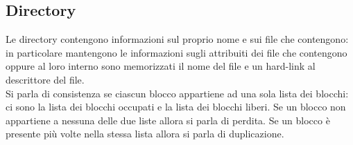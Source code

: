 \documentclass{article}
\begin{document}
\subsection{Directory}
Le directory contengono informazioni sul proprio nome e sui file che contengono: in particolare mantengono le informazioni sugli attribuiti dei file che contengono oppure al loro interno sono memorizzati il nome del file e un hard-link al descrittore del file.\\

Si parla di consistenza se ciascun blocco appartiene ad una sola lista dei blocchi: ci sono la lista dei blocchi occupati e la lista dei blocchi liberi. Se un blocco non appartiene a nessuna delle due liste allora si parla di perdita. Se un blocco è presente più volte nella stessa lista allora si parla di duplicazione.
\end{document}
